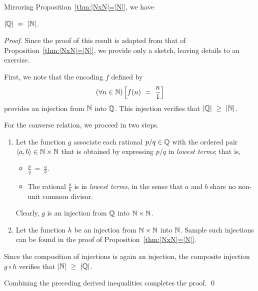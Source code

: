 \smallskip

\hspace*{.35in}{\em the set $\N$ has the same cardinality as the set $\Q$.}

\smallskip

\noindent
Mirroring Proposition~\ref{thm:|NxN|=|N|}, we have

\begin{prop}
\label{thm:|Q|=|N|}
$|\mathbb{Q}| \ = \ |\mathbb{N}|$.
\end{prop}

\begin{proof}
Since the proof of this result is adapted from that of Proposition~\ref{thm:|NxN|=|N|}, we provide only a sketch, leaving details to an exercise.

\smallskip

First, we note that the encoding $f$ defined by
\[ (\forall n \in \N) \left[ f(n) \ = \ \frac{n}{1} \right] \]
provides an injection from $\N$ into $\Q$.  This injection verifies that $|\mathbb{Q}| \ \geq \ |\mathbb{N}|$.

\smallskip

For the converse relation, we proceed in two steps.
\begin{enumerate}
\item
Let the function $g$ associate each rational $p/q \in \mathbb{Q}$ with the ordered pair $\langle a, b \rangle \in \mathbb{N} \times \mathbb{N}$ that is obtained by expressing $p/q$ in {\em lowest terms}; that is,
  \begin{itemize}
  \item
$\displaystyle \frac{p}{q} \ = \ \frac{a}{b}$.
  \item
The rational $\displaystyle \frac{a}{b}$ is in {\em lowest terms}, in the sense that $a$ and $b$ share no non-unit common divisor.
  \end{itemize}
Clearly, $g$ is an injection from $\Q$ into $\mathbb{N} \times \mathbb{N}$.

\item
Let the function $h$ be an injection from $\mathbb{N} \times \mathbb{N}$ into $\N$.  Sample such injections can be found in the proof of Proposition~\ref{thm:|NxN|=|N|}.
\end{enumerate}
Since the composition of injections is again an injection, the composite injection $g \circ h$ verifies that $|\mathbb{N}| \ \geq \ |\mathbb{Q}|$.

\smallskip

Combining the preceding derived inequalities completes the proof.
\qed
\end{proof}


